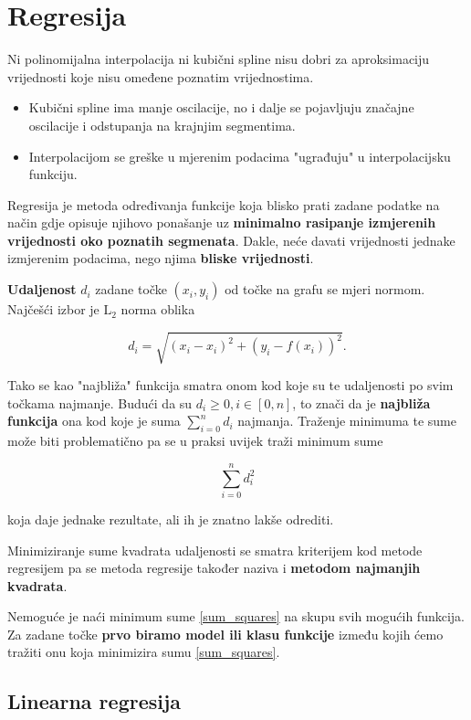 
\section{Regresija}

Ni polinomijalna interpolacija ni kubični spline nisu dobri za aproksimaciju vrijednosti koje nisu omeđene poznatim vrijednostima.
\begin{itemize}
    \item Kubični spline ima manje oscilacije, no i dalje se pojavljuju značajne oscilacije i odstupanja na krajnjim segmentima.
    \item Interpolacijom se greške u mjerenim podacima "ugrađuju" u interpolacijsku funkciju.
\end{itemize}

Regresija je metoda određivanja funkcije koja blisko prati zadane podatke na način gdje opisuje njihovo ponašanje uz \textbf{minimalno rasipanje izmjerenih vrijednosti oko poznatih segmenata}. Dakle, neće davati vrijednosti jednake izmjerenim podacima, nego njima \textbf{bliske vrijednosti}.

\textbf{Udaljenost} $d_i$ zadane točke $(x_i, y_i)$ od točke na grafu se mjeri normom.
Najčešći izbor je $\mathrm{L}_2$ norma oblika

$$
d_i=\sqrt{(x_i-x_i)^2+(y_i-f(x_i))^2}.
$$

Tako se kao "najbliža" funkcija smatra onom kod koje su te udaljenosti po svim točkama najmanje. Budući da su $d_i\geq0, i\in[0,n]$, to znači da je \textbf{najbliža funkcija} ona kod koje je suma $\sum_{i=0}^nd_i$ najmanja.
Traženje minimuma te sume može biti problematično pa se u praksi uvijek traži minimum sume

\begin{equation}
    \label{sum_squares}
    \sum_{i=0}^nd_i^2
\end{equation}

koja daje jednake rezultate, ali ih je znatno lakše odrediti.

Minimiziranje sume kvadrata udaljenosti se smatra kriterijem kod metode regresijem pa se metoda regresije također naziva i \textbf{metodom najmanjih kvadrata}.

Nemoguće je naći minimum sume \ref{sum_squares} na skupu svih mogućih funkcija. Za zadane točke \textbf{prvo biramo model ili klasu funkcije} između kojih ćemo tražiti onu koja minimizira sumu \ref{sum_squares}.

\subsection{Linearna regresija}

